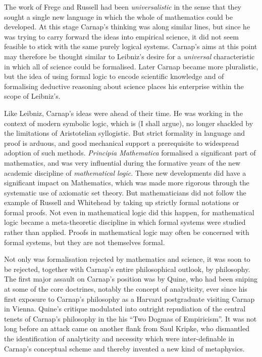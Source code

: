 The work of Frege and Russell had been \emph{universalistic} in the
sense that they sought a single new language in which the whole of
mathematics could be developed. 
At this stage Carnap's thinking was along similar lines, but since he
was trying to carry forward the ideas into empirical science, it did
not seem feasible to stick with the same purely logical systems. 
Carnap's aims at this point may therefore be thought similar to
Leibniz's desire for a \emph{universal} characteristic in which all of
science could be formalised. 
Later Carnap became more pluralistic, but the idea of using formal
logic to encode scientific knowledge and of formalising deductive
reasoning about science places his enterprise within the scope of
Leibniz's. 

Like Leibniz, Carnap's ideas were ahead of their time.
He was working in the context of modern symbolic logic, which is (I
shall argue), no longer shackled by the limitations of Aristotelian
syllogistic. 
But strict formality in language and proof is arduous, and good
mechanical support a prerequisite to widespread adoption of such
methods. 
\emph{Principia Mathematica} formalised a significant part of
mathematics, and was very influential during the formative years of
the new academic discipline of \emph{mathematical logic}. 
These new developments did have a significant impact on Mathematics,
which was made more rigorous through the systematic use of axiomatic
set theory. 
But mathematicians did not follow the example of Russell and Whitehead
by taking up strictly formal notations or formal proofs. 
Not even in mathematical logic did this happen, for mathematical logic
became a meta-theoretic discipline in which formal systems were
studied rather than applied. 
Proofs in mathematical logic may often be concerned with formal
systems, but they are not themselves formal. 

Not only was formalisation rejected by mathematics and science, it was
soon to be rejected, together with Carnap's entire philosophical
outlook, by philosophy. 
The first major assault on Carnap's position was by Quine, who had
been sniping at some of the core doctrines, notably the concept of
analyticity, ever since his first exposure to Carnap's philosophy as a
Harvard postgraduate visiting Carnap in Vienna. 
Quine's critique modulated into outright repudiation of the central
tenets of Carnap's philosophy in the his ``Two Dogmas of
Empiricism''. 
It was not long before an attack came on another flank from Saul
Kripke, who dismantled the identification of analyticity and necessity
which were inter-definable in Carnap's conceptual scheme and thereby
invented a new kind of metaphysics. 

